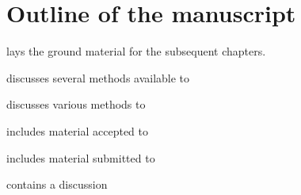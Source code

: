 \section{Outline of the manuscript} %
\label{sec:outline}


        lays the ground material for the subsequent chapters.

        discusses several methods available to

        discusses various methods to

        includes material accepted to

        includes material submitted to

        contains a discussion


